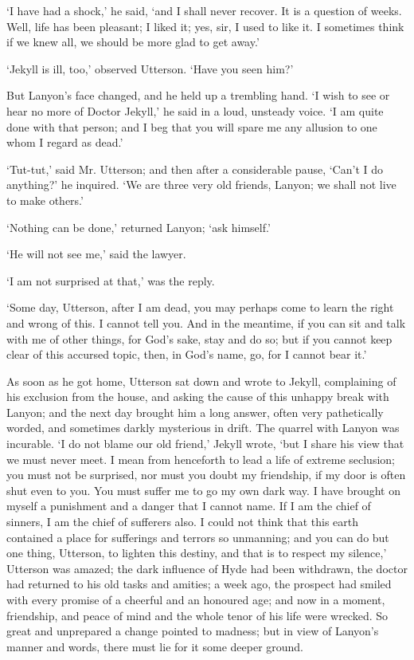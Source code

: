 \documentclass[]{novel}
\begin{document}
‘I have had a shock,’ he said, ‘and I shall never recover. It is a question of weeks. Well, life has been pleasant; I liked it; yes, sir, I used to like it. I sometimes think if we knew all, we should be more glad to get away.’

‘Jekyll is ill, too,’ observed Utterson. ‘Have you seen him?’

But Lanyon’s face changed, and he held up a trembling hand. ‘I wish to see or hear no more of Doctor Jekyll,’ he said in a loud, unsteady voice. ‘I am quite done with that person; and I beg that you will spare me any allusion to one whom I regard as dead.’

‘Tut-tut,’ said Mr. Utterson; and then after a considerable pause, ‘Can’t I do anything?’ he inquired. ‘We are three very old friends, Lanyon; we shall not live to make others.’

‘Nothing can be done,’ returned Lanyon; ‘ask himself.’

‘He will not see me,’ said the lawyer.

‘I am not surprised at that,’ was the reply.

‘Some day, Utterson, after I am dead, you may perhaps come to learn the right and wrong of this. I cannot tell you. And in the meantime, if you can sit and talk with me of other things, for God’s sake, stay and do so; but if you cannot keep clear of this accursed topic, then, in God’s name, go, for I cannot bear it.’

As soon as he got home, Utterson sat down and wrote to Jekyll, complaining of his exclusion from the house, and asking the cause of this unhappy break with Lanyon; and the next day brought him a long answer, often very pathetically worded, and sometimes darkly mysterious in drift. The quarrel with Lanyon was incurable. ‘I do not blame our old friend,’ Jekyll wrote, ‘but I share his view that we must never meet. I mean from henceforth to lead a life of extreme seclusion; you must not be surprised, nor must you doubt my friendship, if my door is often shut even to you. You must suffer me to go my own dark way. I have brought on myself a punishment and a danger that I cannot name. If I am the chief of sinners, I am the chief of sufferers also. I could not think that this earth contained a place for sufferings and terrors so unmanning; and you can do but one thing, Utterson, to lighten this destiny, and that is to respect my silence,’ Utterson was amazed; the dark influence of Hyde had been withdrawn, the doctor had returned to his old tasks and amities; a week ago, the prospect had smiled with every promise of a cheerful and an honoured age; and now in a moment, friendship, and peace of mind and the whole tenor of his life were wrecked. So great and unprepared a change pointed to madness; but in view of Lanyon’s manner and words, there must lie for it some deeper ground.
\end{document}
